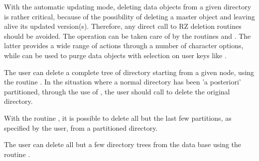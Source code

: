 With the automatic updating mode, deleting data objects from a given
directory is rather critical, because of the possibility of deleting a
master object and leaving alive its updated version(s). Therefore, any
direct call to RZ deletion routines should be avoided. The operation can
be taken care of by the routines  and . The latter provides
a wide range of actions through a number of character options, while
 can be used to purge data objects with selection on user keys
like .

The user can delete a complete tree of directory starting from a given
node, using the routine . In the situation where a normal
directory has been 'a posteriori' partitioned, through the use of
, the user should call  to delete the original directory.

With the routine , it is possible to delete all but the last few
partitions, as specified by the user, from a partitioned directory.

The user can delete all but a few directory trees from the data base
using the routine .
